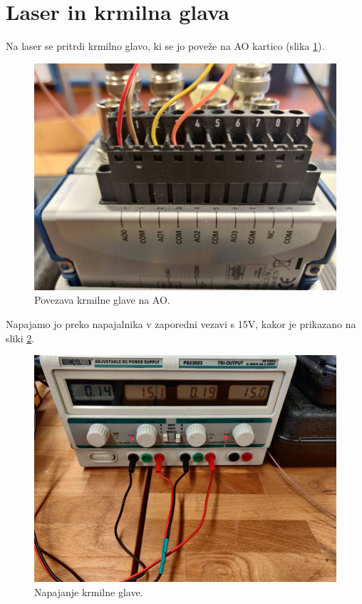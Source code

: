 \section{Laser in krmilna glava}
Na laser se pritrdi krmilno glavo, ki se jo poveže na AO kartico (slika \ref{fig:ao}). 

\begin{figure}[H]
    \centering
    \includegraphics[width=.75\linewidth]{slike/povezava_na_ao.jpg}
    \caption{Povezava krmilne glave na AO.}
    \label{fig:ao}
\end{figure}
Napajamo jo preko napajalnika v zaporedni vezavi s 15V, kakor je prikazano na sliki \ref{fig:napajanje_krmilne_glave}.
\begin{figure}[H]
    \centering
    \includegraphics[width=0.75\linewidth]{slike/napajanje_glave.jpg}
    \caption{Napajanje krmilne glave.}
    \label{fig:napajanje_krmilne_glave}
\end{figure}